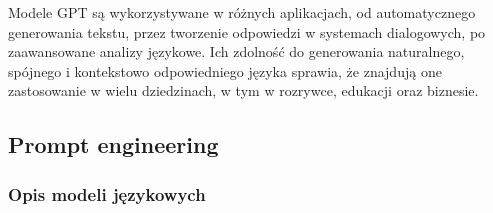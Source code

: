 \begin{enumerate}
    Modele GPT są wykorzystywane w różnych aplikacjach, od automatycznego generowania tekstu, przez tworzenie odpowiedzi w systemach dialogowych, po zaawansowane analizy językowe. Ich zdolność do generowania naturalnego, spójnego i kontekstowo odpowiedniego języka sprawia, że znajdują one zastosowanie w wielu dziedzinach, w tym w rozrywce, edukacji oraz biznesie.
    \\
     
 \end{enumerate}

\subsection{Prompt engineering}

\subsubsection{Opis modeli językowych}


